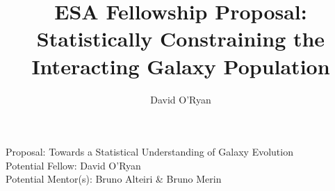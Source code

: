 \documentclass[11pt]{article}
\title{ESA Fellowship Proposal: Statistically Constraining the Interacting Galaxy Population}
\author{David O'Ryan}
\begin{document}
    \begin{center}
        \large{{Proposal: Towards a Statistical Understanding of Galaxy Evolution \\
        Potential Fellow: David O'Ryan \\
        Potential Mentor(s): Bruno Alteiri \& Bruno Merin}}
    \end{center}
    
\end{document}
